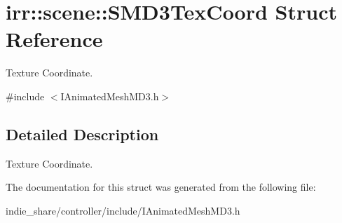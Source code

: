 \hypertarget{structirr_1_1scene_1_1SMD3TexCoord}{}\section{irr\+:\+:scene\+:\+:S\+M\+D3\+Tex\+Coord Struct Reference}
\label{structirr_1_1scene_1_1SMD3TexCoord}


Texture Coordinate.  




{\ttfamily \#include $<$I\+Animated\+Mesh\+M\+D3.\+h$>$}



\subsection{Detailed Description}
Texture Coordinate. 

The documentation for this struct was generated from the following file\+:\begin{DoxyCompactItemize}
\item 
indie\+\_\+share/controller/include/I\+Animated\+Mesh\+M\+D3.\+h\end{DoxyCompactItemize}
